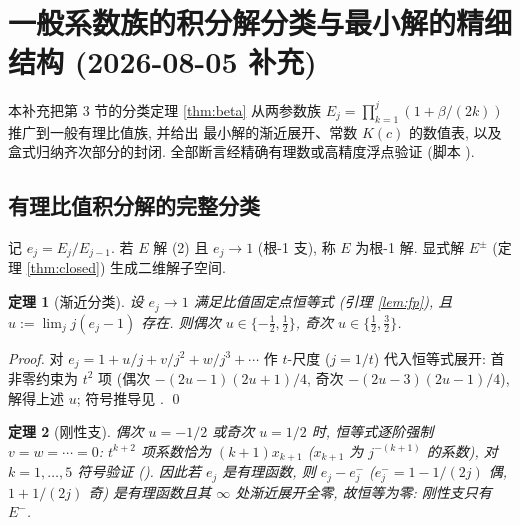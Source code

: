 \documentclass[UTF8]{ctexart}
\newtheorem{theorem}{定理}[section]
\begin{document}
\section{一般系数族的积分解分类与最小解的精细结构 (2026-08-05 补充)}

本补充把第 3 节的分类定理 \ref{thm:beta} 从两参数族
$E_j = \prod_{k=1}^j (1+\beta/(2k))$ 推广到一般有理比值族, 并给出
最小解的渐近展开、常数 $K(c)$ 的数值表, 以及盒式归纳齐次部分的封闭.
全部断言经精确有理数或高精度浮点验证 (脚本 ).

\subsection{有理比值积分解的完整分类}

记 $e_j = E_j/E_{j-1}$. 若 $E$ 解 (2) 且 $e_j \to 1$ (根-1 支), 称
$E$ 为根-1 解. 显式解 $E^\pm$ (定理 \ref{thm:closed}) 生成二维解子空间.

\begin{theorem}[渐近分类]\label{thm:asym}
	设 $e_j \to 1$ 满足比值固定点恒等式 (引理 \ref{lem:fp}), 且
	$u := \lim_j j(e_j - 1)$ 存在. 则偶次 $u \in \{-\tfrac12, \tfrac12\}$,
	奇次 $u \in \{\tfrac12, \tfrac32\}$.
\end{theorem}

\begin{proof}
	对 $e_j = 1 + u/j + v/j^2 + w/j^3 + \cdots$ 作 $t$-尺度
	($j = 1/t$) 代入恒等式展开: 首非零约束为 $t^2$ 项
	(偶次 $-(2u-1)(2u+1)/4$, 奇次 $-(2u-3)(2u-1)/4$), 解得上述 $u$;
	符号推导见 . \qed
\end{proof}

\begin{theorem}[刚性支]\label{thm:rigid}
	偶次 $u = -1/2$ 或奇次 $u = 1/2$ 时, 恒等式逐阶强制
	$v = w = \cdots = 0$: $t^{k+2}$ 项系数恰为 $(k+1)x_{k+1}$
	($x_{k+1}$ 为 $j^{-(k+1)}$ 的系数), 对 $k = 1, \dots, 5$ 符号验证
	(). 因此若 $e_j$ 是有理函数,
	则 $e_j - e^-_j$ ($e^-_j = 1 - 1/(2j)$ 偶, $1 + 1/(2j)$ 奇)
	是有理函数且其 $\infty$ 处渐近展开全零, 故恒等为零:
	刚性支只有 $E^-$.
\end{theorem}
\end{document}
